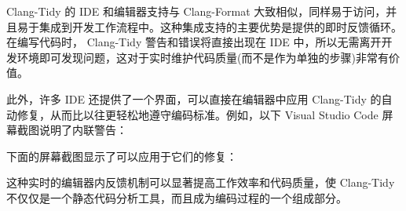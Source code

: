 Clang-Tidy 的 IDE 和编辑器支持与 Clang-Format 大致相似，同样易于访问，并且易于集成到开发工作流程中。这种集成支持的主要优势是提供的即时反馈循环。在编写代码时， Clang-Tidy 警告和错误将直接出现在 IDE 中，所以无需离开开发环境即可发现问题，这对于实时维护代码质量(而不是作为单独的步骤)非常有价值。

此外，许多 IDE 还提供了一个界面，可以直接在编辑器中应用 Clang-Tidy 的自动修复，从而比以往更轻松地遵守编码标准。例如，以下 Visual Studio Code 屏幕截图说明了内联警告：


下面的屏幕截图显示了可以应用于它们的修复：


这种实时的编辑器内反馈机制可以显著提高工作效率和代码质量，使 Clang-Tidy 不仅仅是一个静态代码分析工具，而且成为编码过程的一个组成部分。









